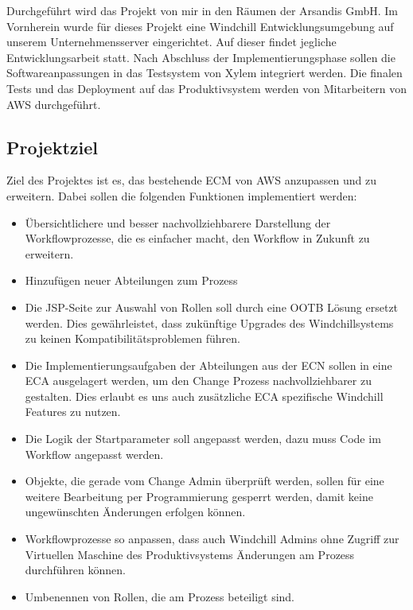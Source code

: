 Durchgeführt wird das Projekt von mir in den Räumen der Arsandis GmbH.
Im Vornherein wurde für dieses Projekt eine Windchill Entwicklungsumgebung auf unserem Unternehmensserver eingerichtet.
Auf dieser findet jegliche Entwicklungsarbeit statt.
Nach Abschluss der Implementierungsphase sollen die Softwareanpassungen in das Testsystem von Xylem integriert werden.
Die finalen Tests und das Deployment auf das Produktivsystem werden von Mitarbeitern von AWS durchgeführt.

\subsection{Projektziel} 
\label{sec:Projektziel}
Ziel des Projektes ist es, das bestehende \ac{ECM} von \ac{AWS} anzupassen und zu erweitern.
Dabei sollen die folgenden Funktionen implementiert werden:
\begin{itemize}
	\item Übersichtlichere und besser nachvollziehbarere Darstellung der Workflowprozesse, die es einfacher macht, den Workflow in Zukunft zu erweitern.
	\item Hinzufügen neuer Abteilungen zum Prozess
	\item Die JSP-Seite zur Auswahl von Rollen soll durch eine \ac{OOTB} Lösung ersetzt werden.
	Dies gewährleistet, dass zukünftige Upgrades des Windchillsystems zu keinen Kompatibilitätsproblemen führen.
	\item Die Implementierungsaufgaben der Abteilungen aus der \ac{ECN} sollen in eine \ac{ECA} ausgelagert werden, um den Change Prozess nachvollziehbarer zu gestalten.
	Dies erlaubt es uns auch zusätzliche \ac{ECA} spezifische Windchill Features zu nutzen.
	\item Die Logik der Startparameter soll angepasst werden, dazu muss Code im Workflow angepasst werden.
	\item Objekte, die gerade vom Change Admin überprüft werden, sollen für eine weitere Bearbeitung per Programmierung gesperrt werden, damit keine ungewünschten Änderungen erfolgen können.
	\item Workflowprozesse so anpassen, dass auch Windchill Admins ohne Zugriff zur Virtuellen Maschine des Produktivsystems Änderungen am Prozess durchführen können.
	\item Umbenennen von Rollen, die am Prozess beteiligt sind.
\end{itemize}

